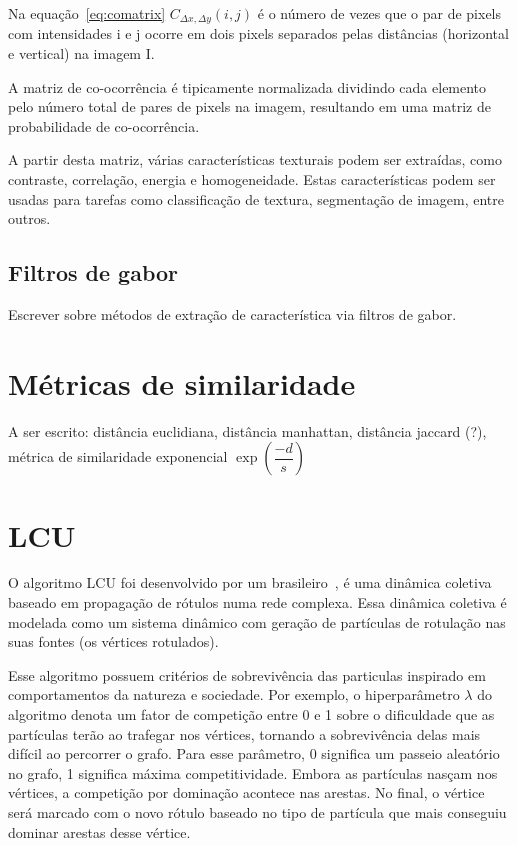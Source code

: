 Na equação~\ref{eq:comatrix} $C_{\Delta x, \Delta y}(i,j)$ é o número de vezes
que o par de pixels com intensidades i e j ocorre em dois pixels
separados pelas distâncias (horizontal e vertical) na imagem I.

A matriz de co-ocorrência é tipicamente normalizada dividindo cada
elemento pelo número total de pares de pixels na imagem, resultando em
uma matriz de probabilidade de co-ocorrência.

A partir desta matriz, várias características texturais podem ser
extraídas, como contraste, correlação, energia e homogeneidade. Estas
características podem ser usadas para tarefas como classificação de
textura, segmentação de imagem, entre outros.

\subsection{Filtros de gabor}\label{sec:filtros-gabor}

Escrever sobre métodos de extração de característica via filtros de gabor.

\section{Métricas de similaridade}\label{sec:teorica-metricas-de-similaridade}

A ser escrito: distância euclidiana, distância manhattan, distância
jaccard (?), métrica de similaridade exponencial $\exp(\dfrac{-d}{s})$

\section{LCU}\label{sec:teorica-lcu}

O algoritmo \gls{LCU} foi desenvolvido por um
brasileiro~\cite{VerriNetworkUnfoldingMap2018}, é uma dinâmica
coletiva baseado em propagação de rótulos numa rede complexa. Essa
dinâmica coletiva é modelada como um sistema dinâmico com geração de
partículas de rotulação nas suas fontes (os vértices rotulados).

Esse algoritmo possuem critérios de sobrevivência das particulas
inspirado em comportamentos da natureza e sociedade. Por exemplo, o
hiperparâmetro $ \lambda $ do algoritmo denota um fator de competição entre
0 e 1 sobre o dificuldade que as partículas terão ao trafegar nos
vértices, tornando a sobrevivência delas mais difícil ao percorrer o
grafo. Para esse parâmetro, 0 significa um passeio aleatório no grafo,
1 significa máxima competitividade. Embora as partículas nasçam nos
vértices, a competição por dominação acontece nas arestas. No final, o
vértice será marcado com o novo rótulo baseado no tipo de partícula
que mais conseguiu dominar arestas desse vértice.

